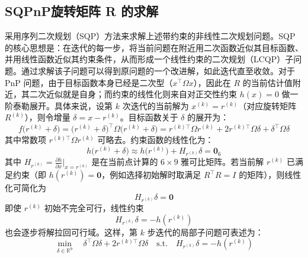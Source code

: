 \subsection{SQPnP旋转矩阵 R 的求解}
采用序列二次规划（SQP）方法来求解上述带约束的非线性二次规划问题。SQP 的核心思想是：在迭代的每一步，将当前问题在附近用二次函数近似其目标函数、并用线性函数近似其约束条件，从而形成一个线性约束的二次规划（LCQP）子问题​
。通过求解该子问题可以得到原问题的一个改进解，如此迭代直至收敛。对于PnP 问题，由于目标函数本身已经是二次型（$x^\top \Omega x$），因此在 $R$ 的当前估计值附近，其二次近似就是自身；而约束的线性化则来自对正交性约束 $h(x)=0$ 做一阶泰勒展开​。具体来说，设第 $k$ 次迭代的当前解为 $x^{(k)} = r^{(k)}$（对应旋转矩阵 $R^{(k)}$），则令增量 $\delta = x - r^{(k)}$。目标函数关于 $\delta$ 的展开为：
\begin{equation}
	f\bigl(r^{(k)} + \delta\bigr)
	= \bigl(r^{(k)} + \delta\bigr)^{\top} \Omega \bigl(r^{(k)} + \delta\bigr)
	= r^{(k)\top}\Omega r^{(k)}  +  2 r^{(k)\top}\Omega \delta  +  \delta^\top\Omega \delta
\end{equation}
其中常数项 $r^{(k)\top}\Omega r^{(k)}$ 可略去。约束函数的线性化为：
\begin{equation}
	h\bigl(r^{(k)} + \delta\bigr)
	 \approx 
	h\bigl(r^{(k)}\bigr)
	 + 
	H_{r^{(k)}} \delta
	 = 
	\mathbf{0}_6
\end{equation}
其中 $H_{r^{(k)}} = \frac{\partial h}{\partial x}\big|_{x=r^{(k)}}$ 是在当前点计算的 $6\times 9$ 雅可比矩阵。若当前解 $r^{(k)}$ 已满足约束（即 $h(r^{(k)})=\mathbf{0}$，例如选择初始解时取满足 $R^\top R=I$ 的矩阵），则线性化可简化为
\begin{equation}
	H_{r^{(k)}} \delta  =  \mathbf{0}
\end{equation}
即使 $r^{(k)}$ 初始不完全可行，线性约束
\begin{equation}
	H_{r^{(k)}} \delta 
	 =  
	- h(r^{(k)})
\end{equation}
也会逐步将解拉回可行域。这样，第 $k$ 步迭代的局部子问题可表述为：
\begin{equation}
	\min_{\delta \in \mathbb{R}^9} 
	\quad 
	\delta^\top \Omega  \delta 
	 +  2 r^{(k)\top} \Omega  \delta
	\quad 
	\text{s.t.} 
	\quad 
	H_{r^{(k)}} \delta 
	 =  
	- h(r^{(k)})
\end{equation}

